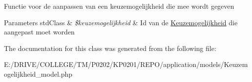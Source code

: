 Functie voor de aanpassen van een keuzemogelijkheid die mee wordt gegeven 
\begin{DoxyParams}[1]{Parameters}
std\+Class & {\em \$keuzemogelijkheid} & Id van de \mbox{\hyperlink{class_keuzemogelijkheid}{Keuzemogelijkheid}} die aangepast moet worden \\
\hline
\end{DoxyParams}


The documentation for this class was generated from the following file\+:\begin{DoxyCompactItemize}
\item 
E\+:/\+D\+R\+I\+V\+E/\+C\+O\+L\+L\+E\+G\+E/\+T\+M/\+P0202/\+K\+P0201/\+R\+E\+P\+O/application/models/Keuzemogelijkheid\+\_\+model.\+php\end{DoxyCompactItemize}
